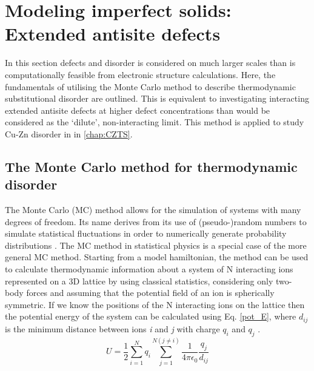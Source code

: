 \documentclass[11pt, twoside]{report}
\begin{document}
\section{Modeling imperfect solids: Extended antisite defects}\label{MC}
In this section defects and disorder is considered on much larger scales than is computationally feasible from electronic structure calculations.
Here, the fundamentals of utilising the Monte Carlo method to describe thermodynamic substitutional disorder are outlined. This is equivalent to investigating interacting extended antisite defects at higher defect concentrations than would be considered as the `dilute', non-interacting limit. This method is applied to study Cu-Zn disorder in {\CZTS} in \autoref{chap:CZTS}.

\subsection{The Monte Carlo method for thermodynamic disorder}
The Monte Carlo (MC) method allows for the simulation of systems with many degrees of freedom. Its name derives from its use of (pseudo-)random numbers to simulate statistical fluctuations in order to numerically generate probability distributions \cite{MC3}.
The MC method in statistical physics is a special case of the more general MC method.
Starting from a model hamiltonian, the method can be used to calculate thermodynamic information about a system of N interacting ions represented on a 3D lattice by using classical statistics, considering only two-body forces and assuming that the potential field of an ion is spherically symmetric. If we know the positions of the N interacting ions on the lattice then the potential energy of the system can be calculated using Eq. \ref{pot_E}, where $d_{ij}$ is the minimum distance between ions \textit{i} and \textit{j} with charge $q_i$ and $q_j$  \cite{Metropolis}.
\begin{equation}\label{pot_E}
U = \frac{1}{2} \sum_{i=1}^N q_i \sum_{j=1}^{N(j \neq i)} \frac{1}{4 \pi \epsilon_0}\frac{q_j}{d_{ij}}
\end{equation}
\end{document}
